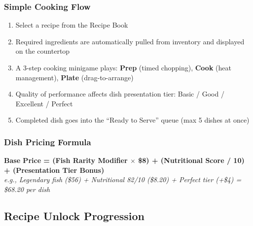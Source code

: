 \documentclass[11pt, letterpaper]{article}
\begin{document}
\subsubsection{Simple Cooking Flow}
\begin{enumerate}
  \item Select a recipe from the Recipe Book
  \item Required ingredients are automatically pulled from inventory and displayed on the countertop
  \item A 3-step cooking minigame plays: \textbf{Prep} (timed chopping), \textbf{Cook} (heat management), \textbf{Plate} (drag-to-arrange)
  \item Quality of performance affects dish presentation tier: Basic / Good / Excellent / Perfect
  \item Completed dish goes into the ``Ready to Serve'' queue (max 5 dishes at once)
\end{enumerate}

\subsubsection{Dish Pricing Formula}

\begin{tcolorbox}[
  colback=purplelight, colframe=purple,
  boxrule=0.5pt, left=8pt, right=8pt, top=6pt, bottom=6pt,
]
\textbf{\color{purple}Base Price = (Fish Rarity Modifier $\times$ \$8) + (Nutritional Score / 10) + (Presentation Tier Bonus)}\\[4pt]
\small\color{darkgray}\textit{e.g., Legendary fish (\$56) + Nutritional 82/10 (\$8.20) + Perfect tier (+\$4) = \$68.20 per dish}
\end{tcolorbox}

\subsection{Recipe Unlock Progression}
\end{document}
